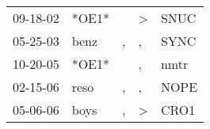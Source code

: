 \begin{supertabular}{lllll}
 09-18-02 &  *OE1* &    &  \textgreater &  SNUC \\
 05-25-03 &   benz &  , &             , &  SYNC \\
 10-20-05 &  *OE1* &    &             , &  nmtr \\
 02-15-06 &   reso &  , &             , &  NOPE \\
 05-06-06 &   boys &  , &  \textgreater &  CRO1 \\
\end{supertabular}

